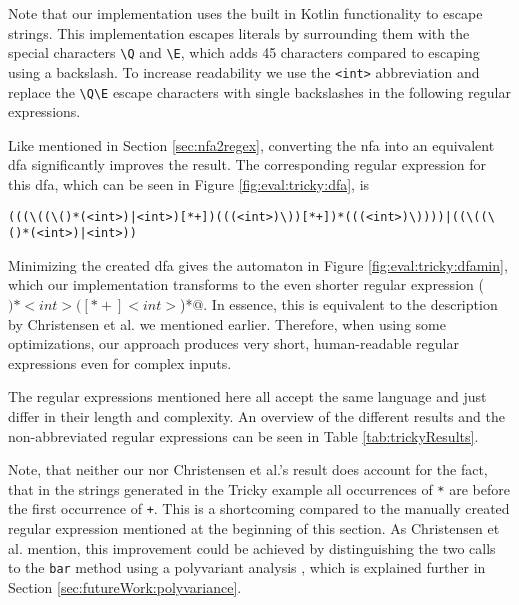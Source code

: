 Note that our implementation uses the built in Kotlin functionality to escape strings. This implementation escapes literals by surrounding them with the special characters \lstinline|\Q| and \lstinline|\E|, which adds 45 characters compared to escaping using a backslash.
To increase readability we use the \lstinline|<int>| abbreviation and replace the \lstinline|\Q\E| escape characters with single backslashes in the following regular expressions.

Like mentioned in Section \ref{sec:nfa2regex}, converting the \ac{nfa} into an equivalent \ac{dfa} significantly improves the result. The corresponding regular expression for this \ac{dfa}, which can be seen in Figure \ref{fig:eval:tricky:dfa}, is 
\begin{Verbatim}[breaklines=true, breakanywhere=true]
(((\((\()*(<int>)|<int>)[*+])(((<int>)\))[*+])*(((<int>)\))))|((\((\()*(<int>)|<int>))
\end{Verbatim}

Minimizing the created \ac{dfa} gives the automaton in Figure \ref{fig:eval:tricky:dfamin}, which our implementation transforms to the even shorter regular expression \Verb@(\()*<int>([*+]<int>\))*@. In essence, this is equivalent to the description by Christensen et al. we mentioned earlier.
Therefore, when using some optimizations, our approach produces very short, human-readable regular expressions even for complex inputs.

The regular expressions mentioned here all accept the same language and just differ in their length and complexity. An overview of the different results and the non-abbreviated regular expressions can be seen in Table \ref{tab:trickyResults}.

Note, that neither our nor Christensen et al.'s result does account for the fact, that in the strings generated in the Tricky example all occurrences of \lstinline|*| are before the first occurrence of \lstinline|+|. This is a shortcoming compared to the manually created regular expression mentioned at the beginning of this section.
As Christensen et al. mention, this improvement could be achieved by distinguishing the two calls to the \lstinline|bar| method using a polyvariant analysis \cite{brics}, which is explained further in Section \ref{sec:futureWork:polyvariance}.

